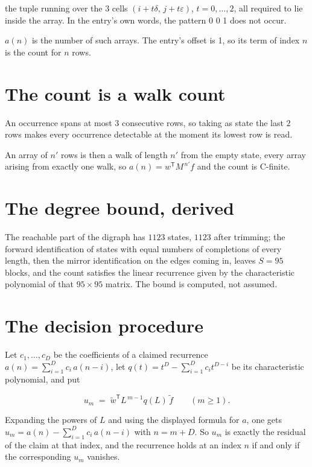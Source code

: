 \documentclass[11pt]{article}
\theoremstyle{definition}
\begin{document}
the tuple running over the $3$ cells $(i+t\delta,\,j+t\varepsilon)$, $t = 0,\dots,2$, all required to lie inside the array. In the entry's own words, the pattern 0 0 1 does not occur.

$a(n)$ is the number of such arrays. The entry's offset is 1, so its term of index $n$ is the count for $n$ rows.

\section{The count is a walk count}

An occurrence spans at most $3$ consecutive rows, so taking as state the last $2$ rows makes every occurrence detectable at the moment its lowest row is read.

An array of $n'$ rows is then a walk of length $n'$ from the empty state, every array arising from exactly one walk, so $a(n) = w^{\mathsf T}M^{\,n'}f$ and the count is C-finite.

\section{The degree bound, derived}

The reachable part of the digraph has $1123$ states, $1123$ after trimming; the forward identification of states with equal numbers of completions of every length, then the mirror identification on the edges coming in, leaves $S = 95$ blocks, and the count satisfies the linear recurrence given by the characteristic polynomial of that $95\times95$ matrix. The bound is computed, not assumed.

\section{The decision procedure}

Let $c_1,\dots,c_D$ be the coefficients of a claimed recurrence $a(n) = \sum_{i=1}^{D} c_i\,a(n-i)$, let $q(t) = t^{D} - \sum_{i=1}^{D} c_i t^{D-i}$ be its characteristic polynomial, and put

\[u_m \;=\; \tilde w^{\mathsf T} L^{\,m-1} q(L)\,\tilde f \qquad (m \ge 1).\]

Expanding the powers of $L$ and using the displayed formula for $a$, one gets $u_m = a(n) - \sum_{i=1}^{D} c_i\,a(n-i)$ with $n = m + D$. So $u_m$ is exactly the residual of the claim at that index, and the recurrence holds at an index $n$ if and only if the corresponding $u_m$ vanishes.
\end{document}

